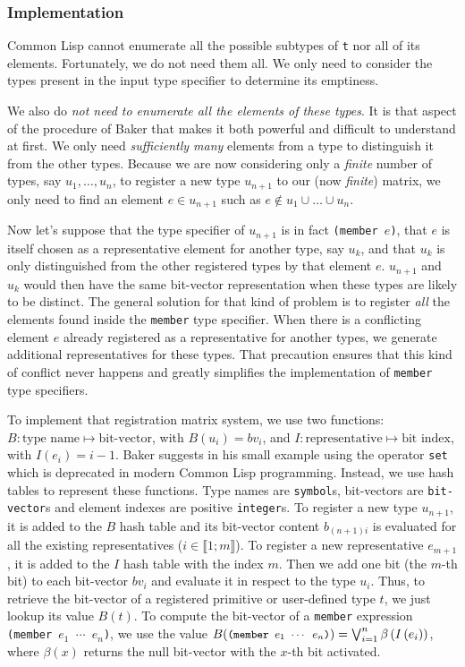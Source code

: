 \documentclass[format=sigconf]{acmart}
\newcommand\intvl[1]{\llbracket#1\rrbracket}
\newcommand\code[2][\small]{\sloppy\texttt{#1#2}}
\newcommand\mcode[2][\small]{\text{\code[#1]{#2}}}
\theoremstyle{definition}
\begin{document}
\subsubsection{Implementation}
Common Lisp cannot enumerate all the possible subtypes of \code{t} nor all of
its elements. Fortunately, we do not need them all. We only need to consider the
types present in the input type specifier to determine its emptiness.

We also do \emph{not need to enumerate all the elements of these types}.
It is that aspect of the procedure of Baker that makes it both powerful and
difficult to understand at first. We only need \emph{sufficiently many} elements
from a type to distinguish it from the other types.
Because we are now considering only a \emph{finite} number of types, say $u_1,
\dots, u_n$, to register a new type $u_{n+1}$ to our (now \emph{finite}) matrix,
we only need to find an element $e \in u_{n+1}$ such as $e \notin u_1 \cup \dots
\cup u_n$.

Now let's suppose that the type specifier of $u_{n+1}$ is in fact \code{(member
  $e$)}, that $e$ is itself chosen as a representative element for another type,
say $u_k$, and that $u_k$ is only distinguished from the other registered types
by that element $e$. $u_{n+1}$ and $u_k$ would then have the same bit-vector
representation when these types are likely to be distinct. The general solution
for that kind of problem is to register \emph{all} the elements found inside the
\code{member} type specifier. When there is a conflicting element $e$ already
registered as a representative for another types, we generate additional
representatives for these types. That precaution ensures that this kind of
conflict never happens and greatly simplifies the implementation of \code{member}
type specifiers.

To implement that registration matrix system, we use two functions:
\sloppy${B : \text{type name} \longmapsto \text{bit-vector}}$,
with $B(u_i) = bv_i$, and
\sloppy${I : \text{representative} \longmapsto \text{bit index}}$,
with $I(e_i) = i - 1$.
Baker suggests in his small example \cite{baker1992} using the operator
\code{set} which is deprecated in modern Common Lisp programming. Instead, we
use hash tables to represent these functions. Type names are \code{symbol}s,
bit-vectors are \code{bit-vector}s and element indexes are positive
\code{integer}s. To register a new type $u_{n+1}$, it is added to the $B$ hash
table and its bit-vector content $b_{(n+1)i}$ is evaluated for all the existing
representatives ($i \in \intvl{1;m}$). To register a new representative
$e_{m+1}$, it is added to the $I$ hash table with the index $m$. Then we add one
bit (the $m$-th bit) to each bit-vector $bv_i$ and evaluate it in respect to the
type $u_i$. Thus, to retrieve the bit-vector of a registered primitive or
user-defined type $t$, we just lookup its value $B(t)$. To compute the
bit-vector of a \code{member} expression \code{(member $e_1$ $\cdots$ $e_n$)},
we use the value
$B(\mcode{(member $e_1$ $\cdots$ $e_n$)}) = \bigvee_{i=1}^n
\beta\left(I\left(e_i\right)\right)$,
where $\beta(x)$ returns the null bit-vector with the $x$-th bit activated.
\end{document}

